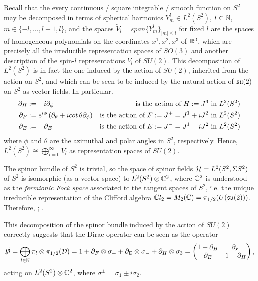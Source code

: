 Recall that the every continuous / square integrable / smooth function on $S^2$ may be decomposed in terms of spherical harmonics $Y^l_m \in L^2(S^2)$, $l \in \mathbb{N}$, $m \in \{-l, \dots, l-1, l\}$, and the spaces $\tilde V_l = span\{Y^l_m\}_{|m| \leq l}$ for fixed $l$ are the spaces of homogeneous polynomials on the coordinates $x^1, x^2, x^3$ of $\mathbb{R}^3$, which are precisely all the irreducible representation spaces of $SO(3)$ and another description of the spin-$l$ representations $V_l$ of $SU(2)$. 
This decomposition of $L^2(S^2)$ is in fact the one induced by the action of $SU(2)$, inherited from the action on $S^2$, and which can be seen to be induced by the natural action of $\mathfrak{su}(2)$ on $S^2$ as vector fields. In particular, 
\begin{align}
    \partial_H &:= - i \partial_\phi & \text{is the action of $\lbtext{H} := J^3$ in $L^2(S^2)$} \\
    \partial_F &:= e^{i\phi} \left( \partial_\theta + i cot\,\theta \partial_\phi \right) &\text{is the action of $\lbtext{F} := J^+ = J^1 + i J^2$ in $L^2(S^2)$}\\
    \partial_E &:= - \partial_E &\text{is the action of $\lbtext{E} := J^- = J^1 - i J^2$ in $L^2(S^2)$}
\end{align} where $\phi$ and $\theta$ are the azimuthal and polar angles in $S^2$, respectively.
Hence, $L^2(S^2) \cong \bigoplus_{l = 0}^\infty V_l$ as representation spaces of $SU(2)$.

The spinor bundle of $S^2$ is trivial, so the space of spinor fields $\mathcal H = L^2(S^2, \Sigma S^2)$ of $S^2$ is isomorphic (as a vector space) to $L^2(S^2) \otimes \mathbb{C}^2$, where $\mathbb{C}^2$ is understood as the \textit{fermionic Fock space} associated to the tangent spaces of $S^2$, i.e. the unique irreducible representation of the Clifford algebra $\mathbb{C} l_2 = M_2(\mathbb{C}) = \pi_{1/2}(U(\mathfrak{su}(2)))$. Therefore, ; .

\lin

This decomposition of the spinor bundle induced by the action of $SU(2)$ correctly suggests that the Dirac operator can be seen as the operator
\begin{equation}\label{equationSU2InducedSeriesDiracSlashedAndMatrix}
    \textcolor{black}{\slashed D} =  \bigoplus_{l\in \mathbb{N}} \pi_l  \otimes \pi_{1/2}(\mathcal D) = 1 + \partial_F \otimes \sigma_+ + \partial_E \otimes \sigma_- + \partial_H \otimes \sigma_3 = \begin{pmatrix} 1 + \partial_H & \partial_F \\ \partial_E & 1 - \partial_H\end{pmatrix} ,
\end{equation} acting on $L^2(S^2)\otimes \mathbb{C}^2$, where $\sigma^\pm = \sigma_1 \pm i \sigma_2$.

